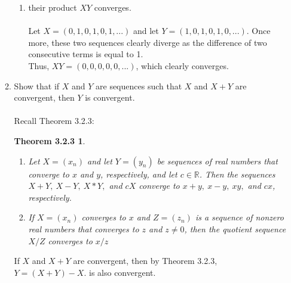 \documentclass[12pt,letterpaper]{article}
\newcommand{\R}{\mathbb{R}}
\newtheorem*{3.2.3}{Theorem 3.2.3}
\theoremstyle{case}
\begin{document}
\begin{enumerate}
\begin{enumerate}
\begin{enumerate}
				\item[(b)] their product $XY$ converges.
				\\\\Let $X=(0,1,0,1,0,1,...)$ and let $Y=(1,0,1,0,1,0,...)$. Once more, these two sequences clearly diverge as the difference of two consecutive terms is equal to 1.
				\\Thus, $XY=(0,0,0,0,0,...)$, which clearly converges.
			\end{enumerate}
			\item[3)] Show that if $X$ and $Y$ are sequences such that $X$ and $X+Y$ are convergent, then $Y$ is convergent.
			\\\\Recall Theorem 3.2.3:
			\begin{3.2.3}
				\begin{enumerate}
					\item[\textbf{(a)}] Let $X=(x_n)$ and let $Y=(y_n)$ be sequences of real numbers that converge to $x$ and $y$, respectively, and let $c \in \R$. Then the sequences $X+Y,\ X-Y,\ X*Y,$ and $cX$ converge to $x+y,\ x-y,\ xy,$ and $cx$, respectively.
					\item[\textbf{(b)}] If $X=(x_n)$ converges to $x$ and $Z=(z_n)$ is a sequence of nonzero real numbers that converges to $z$ and $z \neq 0$, then the quotient sequence $X/Z$ converges to $x/z$
				\end{enumerate}
			\end{3.2.3}
			If $X$ and $X+Y$ are convergent, then by Theorem 3.2.3, $Y=(X+Y)-X$. is also convergent.
			

\end{enumerate}
\end{enumerate}
\end{document}
